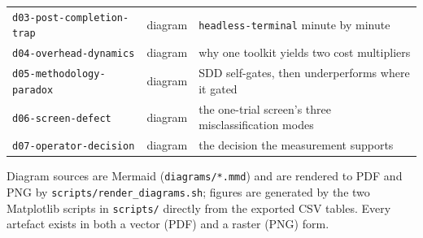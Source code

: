 \documentclass[11pt,a4paper]{article}
\newcommand{\code}[1]{\texttt{\small #1}}
\newcommand{\task}[1]{\texttt{\footnotesize #1}}
\begin{document}
\begin{center}
\begin{tabular}{@{}llp{8.4cm}@{}}
\code{d03-post-completion-trap} & diagram & \task{headless-terminal} minute by minute \\
\code{d04-overhead-dynamics} & diagram & why one toolkit yields two cost multipliers \\
\code{d05-methodology-paradox} & diagram & SDD self-gates, then underperforms where it gated \\
\code{d06-screen-defect} & diagram & the one-trial screen's three misclassification modes \\
\code{d07-operator-decision} & diagram & the decision the measurement supports \\
\bottomrule
\end{tabular}
\end{center}

Diagram sources are Mermaid (\code{diagrams/*.mmd}) and are rendered to PDF and PNG by
\code{scripts/render\_diagrams.sh}; figures are generated by the two Matplotlib scripts in
\code{scripts/} directly from the exported CSV tables. Every artefact exists in both a vector
(PDF) and a raster (PNG) form.
\end{document}
